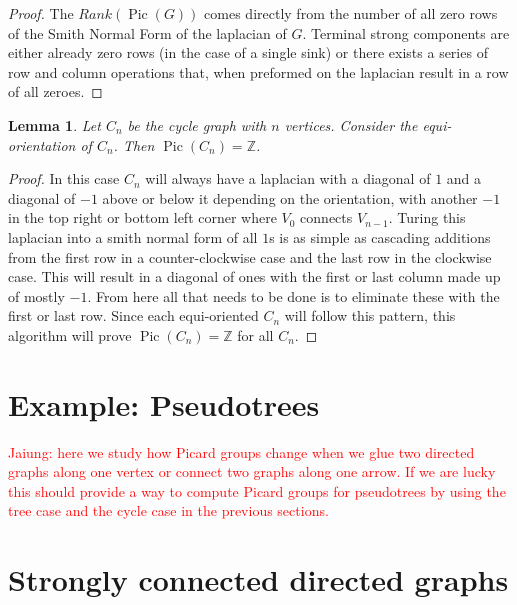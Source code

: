 \documentclass[11pt,reqno]{amsart}
\DeclareMathOperator{\Pic}{Pic}
\theoremstyle{definition}
\theoremstyle{plain}
\newtheorem{lem}[mydef]{\textbf{Lemma}}
\begin{document}
		\begin{proof}
			The $Rank(\Pic(G))$ comes directly from the number of all zero rows of the Smith Normal Form of the laplacian of
			$G$.  Terminal strong components are either already zero rows (in the case of a single sink) or there
			exists a series of row and column operations that, when preformed on the laplacian result in a row of all
			zeroes.
		\end{proof}

	\begin{lem}
		Let $C_n$ be the cycle graph with $n$ vertices. Consider the equi-orientation of $C_n$.
		Then $\Pic(C_n)=\mathbb{Z}$.
	\end{lem}
	\begin{proof}
		In this case $C_n$ will always have a laplacian with a diagonal of $1$ and a diagonal of $-1$
		above or below it depending on the orientation, with another $-1$ in the top right or bottom left corner
		where $V_0$ connects $V_{n-1}$.  Turing this laplacian into a smith normal form of all $1$s is as simple as
		cascading additions from the first row in a counter-clockwise case and the last row in the clockwise case.
		This will result in a diagonal of ones with the first or last column made up of mostly $-1$.  From here
		all that needs to be done is to eliminate these with the first or last row.  Since each equi-oriented $C_n$
		will follow this pattern, this algorithm will prove $\Pic(C_n)=\mathbb{Z}$ for all $C_n$.
	\end{proof}

\section{Example: Pseudotrees}

	\textcolor{red}{Jaiung: here we study how Picard groups change when we glue two directed graphs along one vertex or
		connect two graphs along one arrow. If we are lucky this should provide a way to compute Picard groups for
		pseudotrees by using the tree case and the cycle case in the previous sections.}

\section{Strongly connected directed graphs}



\end{document}
